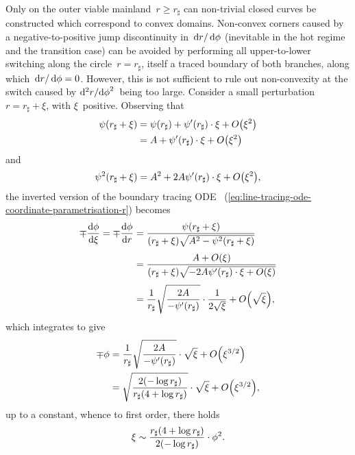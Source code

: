 Only on the outer viable mainland~$r \ge r_\sharp$
can non-trivial closed curves be constructed
which correspond to convex domains.
Non-convex corners
caused by a negative-to-positive jump discontinuity in~$\mathop{}\!\mathrm{d} r / \mathop{}\!\mathrm{d}\phi$
(inevitable in the hot regime and the transition case)
can be avoided
by performing all upper-to-lower switching
along the circle~$r = r_\sharp$,
itself a traced boundary of both branches,
along which~$\mathop{}\!\mathrm{d} r / \mathop{}\!\mathrm{d}\phi = 0$.
However, this is not sufficient to rule out non-convexity at the switch
caused by $\mathop{}\!\mathrm{d}^2 r / {\mathop{}\!\mathrm{d}\phi}^2$~being too large.
Consider a small perturbation~$r = r_\sharp + \xi$,
with $\xi$~positive.
Observing that
\begin{align*}
  \psi (r_\sharp + \xi)
  &=
    \psi (r_\sharp) + \psi' (r_\sharp) \cdot \xi
    + \order \roundbr*{\xi^2}
      \\
  &=
    A + \psi' (r_\sharp) \cdot \xi
    + \order \roundbr*{\xi^2}
\end{align*}
and
\[
  \psi^2 (r_\sharp + \xi) =
  A^2 + 2 A \psi' (r_\sharp) \cdot \xi + \order \roundbr*{\xi^2},
\]
the inverted version of the boundary tracing ODE~%
  (\ref{eq:line-tracing-ode-coordinate-parametrisation-r})
becomes
\begin{align*}
  \mp \tder{\phi}{\xi} = \mp \tder{\phi}{r}
  &=
    \frac{
      \psi (r_\sharp + \xi)
    }{
      (r_\sharp + \xi) \sqrt{A^2 - \psi^2 (r_\sharp + \xi)}
    }
    \\[\fraclinespace]
  &=
    \frac{
      A + \order (\xi)
    }{
      (r_\sharp + \xi)
      \sqrt{-2 A \psi' (r_\sharp) \cdot \xi + \order (\xi)}
    }
    \\[\fraclinespace]
  &=
    \frac{1}{r_\sharp}
    \sqrt{\frac{2 A}{-\psi' (r_\sharp)}}
      \cdot
    \frac{1}{2 \sqrt{\xi}}
    + \order \roundbr*{\sqrt{\xi}},
\end{align*}
which integrates to give
\begin{align*}
  \mp \phi
  &=
    \frac{1}{r_\sharp}
    \sqrt{\frac{2 A}{-\psi' (r_\sharp)}}
      \cdot
    \sqrt{\xi}
    + \order \roundbr*{\xi^{3/2}} \\
  &=
    \sqrt{\frac{2 (-\log r_\sharp)}{r_\sharp (4 + \log r_\sharp)}}
      \cdot
    \sqrt{\xi}
    + \order \roundbr*{\xi^{3/2}},
\end{align*}
up to a constant,
whence to first order, there holds
\begin{equation}
  \xi \sim
  \frac{r_\sharp (4 + \log r_\sharp)}{2 (-\log r_\sharp)} \cdot \phi^2.
  \label{eq:line-traced-boundary-hot-xi-near-r-sharp}
\end{equation}
